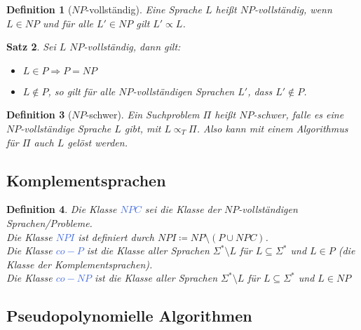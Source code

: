 \documentclass[11pt]{scrartcl}
\newcommand{\tcol}[1]{\textcolor{RoyalBlue}{#1}}
\theoremstyle{break}
\newtheorem{satz}{Satz}[section]
\newtheorem{defi}[satz]{Definition}
\begin{document}
    \begin{defi}[$NP$-vollständig]
        Eine Sprache $L$ heißt $NP$-vollständig, wenn $L\in NP$ und für alle $L'\in NP$ gilt $L'\propto L$.
    \end{defi}

    \begin{satz}
        Sei $L$ $NP$-vollständig, dann gilt:
        \begin{itemize}
            \item $L\in P\Rightarrow P=NP$
            \item $L\notin P$, so gilt für alle $NP$-vollständigen Sprachen $L'$, dass $L'\notin P$.
        \end{itemize}
    \end{satz}


    \begin{defi}[$NP$-schwer]
        Ein Suchproblem $\Pi$ heißt $NP$-schwer, falle es eine $NP$-vollständige Sprache $L$ gibt, mit $L\propto_T\Pi$.
        Also kann mit einem Algorithmus für $\Pi$ auch $L$ gelöst werden.
    \end{defi}


    \subsection{Komplementsprachen}
	\label{subsec:komplementsprachen}

    \begin{defi}
        Die Klasse \tcol{$NPC$} sei die Klasse der $NP$-vollständigen Sprachen/Probleme.\\
        Die Klasse \tcol{$NPI$} ist definiert durch $NPI\coloneqq NP\setminus(P\cup NPC)$.\\
        Die Klasse \tcol{$co-P$} ist die Klasse aller Sprachen $\Sigma^*\setminus L$ für $L\subseteq\Sigma^*$ und $L\in P$ (die Klasse der Komplementsprachen).\\
        Die Klasse \tcol{$co-NP$} ist die Klasse aller Sprachen $\Sigma^*\setminus L$ für $L\subseteq\Sigma^*$ und $L\in NP$
    \end{defi}


    \subsection{Pseudopolynomielle Algorithmen
	}\label{subsec:pseudopolynomielle-algorithmenindex}
\end{document}
